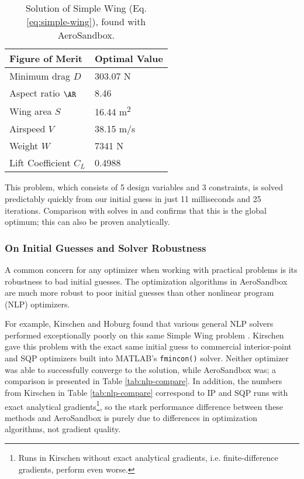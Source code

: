 \begin{table}[H]
    \centering
    \caption{Solution of Simple Wing (Eq. \ref{eq:simple-wing}), found with AeroSandbox.}
    \label{tab:simple-wing}
    \begin{tabular}[t]{ll}
        \toprule
        Figure of Merit        & Optimal Value             \\
        \midrule
        Minimum drag $D$       & 303.07 \si{\newton}       \\
        Aspect ratio $\AR$     & 8.46                      \\
        Wing area $S$          & 16.44 \si{\meter\squared} \\
        Airspeed $V$           & 38.15 \si{\meter/\second} \\
        Weight $W$             & 7341 \si{\newton}         \\
        Lift Coefficient $C_L$ & 0.4988                    \\
        \bottomrule
    \end{tabular}
\end{table}

This problem, which consists of 5 design variables and 3 constraints, is solved predictably quickly from our initial guess in just 11 milliseconds and 25 iterations. Comparison with solves in \cite{Ozturk2018} and \cite{kirschen} confirms that this is the global optimum; this can also be proven analytically.

\subsubsection{On Initial Guesses and Solver Robustness}

A common concern for any optimizer when working with practical problems is its robustness to bad initial guesses. The optimization algorithms in AeroSandbox are much more robust to poor initial guesses than other nonlinear program (NLP) optimizers.

For example, Kirschen and Hoburg found that various general NLP solvers performed exceptionally poorly on this same Simple Wing problem \cite{kirschen}. Kirschen gave this problem with the exact same initial guess to commercial interior-point and SQP optimizers built into MATLAB's \texttt{fmincon()} solver. Neither optimizer was able to successfully converge to the solution, while AeroSandbox was; a comparison is presented in Table \ref{tab:nlp-compare}. In addition, the numbers from Kirschen in Table \ref{tab:nlp-compare} correspond to IP and SQP runs with exact analytical gradients\footnote{Runs in Kirschen \cite{kirschen} without exact analytical gradients, i.e. finite-difference gradients, perform even worse.}, so the stark performance difference between these methods and AeroSandbox is purely due to differences in optimization algorithms, not gradient quality.


